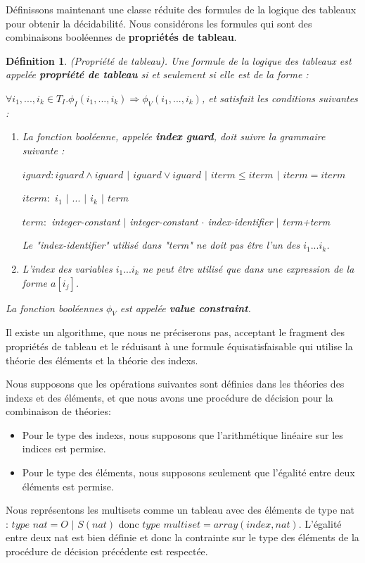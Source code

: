 \documentclass[9pt,openany]{book}
\newtheorem{definition}{D\'efinition}[section]
\begin{document}
	D\'efinissons maintenant une classe r\'eduite des formules de la logique des tableaux pour obtenir la d\'ecidabilit\'e. Nous consid\'erons les formules qui sont des combinaisons bool\'eennes de \textbf{propri\'et\'es de tableau}.
	
	\begin{definition}
		(Propri\'et\'e de tableau). Une formule de la logique des tableaux est appel\'ee \textbf{propri\'et\'e de tableau} si et seulement si elle est de la forme :\par
$\forall i_{1},...,i_{k}\in T_{I}.\phi_{I}(i_{1},...,i_{k})\Longrightarrow\phi_{V}(i_{1},...,i_{k})$, et satisfait les conditions suivantes :
\begin{enumerate}
\item La fonction bool\'eenne, appel\'ee \textbf{index guard}, doit suivre la grammaire suivante :\par
$iguard : iguard\land iguard$ $|$ $iguard\lor iguard$ $|$ $iterm\leq iterm$ $|$ $iterm = iterm$\par
$iterm :$ $i_{1}$ $|$ $...$ $|$ $i_{k}$ $|$ $term$\par
$term :$ integer-constant $|$ integer-constant $\cdot$ index-identifier $|$ term+term\par
Le "index-identifier" utilis\'e dans "term" ne doit pas \^etre l'un des $i_{1}...i_{k}$.
\item L'index des variables $i_{1}...i_{k}$ ne peut \^etre utilis\'e que dans une expression de la forme $a[i_{j}]$.
\end{enumerate}\par
La fonction bool\'eennes $\phi_{V}$ est appel\'ee \textbf{value constraint}.
	\end{definition}
	Il existe un algorithme, que nous ne pr\'eciserons pas, acceptant le fragment des propri\'et\'es de tableau et le r\'eduisant \`a une formule \'equisatisfaisable qui utilise la th\'eorie des \'el\'ements et la th\'eorie des indexs.\par
	Nous supposons que les op\'erations suivantes sont d\'efinies dans les th\'eories des indexs et des \'el\'ements, et que nous avons une proc\'edure de d\'ecision pour la combinaison de th\'eories: 
	\begin{itemize}
	\item Pour le type des indexs, nous supposons que l'arithm\'etique lin\'eaire sur les indices est permise.
	\item Pour le type des \'el\'ements, nous supposons seulement que l'\'egalit\'e entre deux \'el\'ements est permise.
	\end{itemize}
\par
 		Nous repr\'esentons les multisets comme un tableau avec des \'el\'ements de type nat : $ type$ $nat = O$ $|$ $S(nat)$ donc $type$ $multiset = array(index,nat)$. L'\'egalit\'e entre deux nat est bien d\'efinie et donc la contrainte sur le type des \'el\'ements de la proc\'edure de d\'ecision pr\'ec\'edente est respect\'ee.
\end{document}
